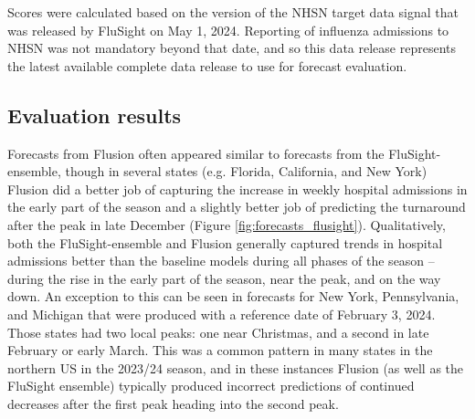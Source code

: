 \documentclass{article}\usepackage[]{graphicx}\usepackage[]{xcolor}
\begin{document}
Scores were calculated based on the version of the NHSN target data signal that was released by FluSight on May 1, 2024.  Reporting of influenza admissions to NHSN was not mandatory beyond that date, and so this data release represents the latest available complete data release to use for forecast evaluation.

\subsection{Evaluation results}

Forecasts from Flusion often appeared similar to forecasts from the FluSight-ensemble, though in several states (e.g. Florida, California, and New York) Flusion did a better job of capturing the increase in weekly hospital admissions in the early part of the season and a slightly better job of predicting the turnaround after the peak in late December (Figure \ref{fig:forecasts_flusight}). Qualitatively, both the FluSight-ensemble and Flusion generally captured trends in hospital admissions better than the baseline models during all phases of the season -- during the rise in the early part of the season, near the peak, and on the way down. An exception to this can be seen in forecasts for New York, Pennsylvania, and Michigan that were produced with a reference date of February 3, 2024. Those states had two local peaks: one near Christmas, and a second in late February or early March. This was a common pattern in many states in the northern US in the 2023/24 season, and in these instances Flusion (as well as the FluSight ensemble) typically produced incorrect predictions of continued decreases after the first peak heading into the second peak.
\end{document}
